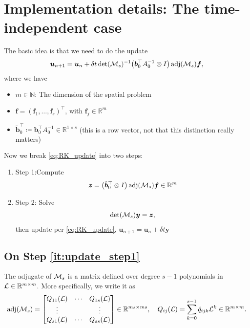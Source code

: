 \documentclass[review]{siamart}
\newcommand{\mdet}{\operatorname{det}}
\newcommand{\madj}{\operatorname{adj}}
\begin{document}
\section{Implementation details:  The time-independent case}
The basic idea is that we need to do the update
\begin{align} \label{eq:RK_update}
\bm{u}_{n+1}  = \bm{u}_n + \delta t \mdet({\cal M}_s)^{-1} \big( \bm{b}_0^\top A^{-1}_0 \otimes I \big) \madj({\cal M}_s) \bm{f},
\end{align}
where we have
\begin{itemize}
\item $m \in \mathbb{N}$: The dimension of the spatial problem

\item $\bm{f} = (\bm{f}_1, \ldots, \bm{f}_s)^\top$, with $\bm{f}_j \in \mathbb{R}^m$

\item $\tilde{\bm{b}}^\top_0 \coloneqq \bm{b}^\top_0 A^{-1}_0 \in \mathbb{R}^{1 \times s}$ (this is a row vector, not that this distinction really matters) 
\end{itemize}

Now we break \eqref{eq:RK_update} into two steps:
\begin{enumerate}
\item{Step 1:}\label{it:update_step1}Compute 
\begin{align} \label{eq:step1}
\bm{z} = \big( \hat{\bm{b}}^\top_0 \otimes I \big) \madj ({\cal M}_s) \bm{f} \in \mathbb{R}^m
\end{align}

\item{Step 2:}\label{it:update_step2} Solve
\begin{align} \label{eq:step2}
\mdet( {\cal M}_s ) \bm{y} = \bm{z},
\end{align}
then update per \eqref{eq:RK_update}, $\bm{u}_{n+1} = \bm{u}_n + \delta t \bm{y}$
\end{enumerate}


\subsection{On Step \ref{it:update_step1}}

The adjugate of ${\cal M}_s$ is a matrix defined over degree  $s-1$ polynomials in ${\cal L} \in \mathbb{R}^{m \times m}$. More specifically, we write it as
\begin{align}
\madj ({\cal M}_s) = 
\begin{bmatrix}
Q_{11}({\cal L}) & \cdots & Q_{1s}({\cal L}) \\
\vdots & & \vdots \\
Q_{s1}({\cal L}) & \cdots & Q_{ss}({\cal L})
\end{bmatrix}
\in \mathbb{R}^{ms \times ms},
\quad
Q_{ij}({\cal L}) = \sum \limits_{k = 0}^{s-1} \hat{q}_{ijk} {\cal L}^k \in \mathbb{R}^{m \times m}.
\end{align}
\end{document}
